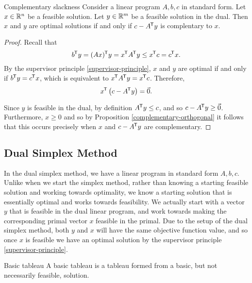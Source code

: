 \begin{thm}{Complementary slackness}\label{complementary-slackness}\proofbreak
    Consider a linear program $A, b, c$ in standard form. Let $x \in \mathbb{R}^n$ be a feasible solution. Let $y \in \mathbb{R}^m$ be a feasible solution in the dual. Then $x$ and $y$ are optimal solutions if and only if $c - A^{\mkern-1.5mu\mathsf{T}}y$ is complentary to $x$.
\end{thm}

\begin{proof}
    Recall that
    \begin{align*}
        b^{\mkern-1.5mu\mathsf{T}}y = (Ax)^{\mkern-1.5mu\mathsf{T}}y = x^{\mkern-1.5mu\mathsf{T}}A^{\mkern-1.5mu\mathsf{T}}y \leq x^{\mkern-1.5mu\mathsf{T}}c = c^{\mkern-1.5mu\mathsf{T}}x.
    \end{align*}
    By the supervisor principle \ref{supervisor-principle}, $x$ and $y$ are optimal if and only if $b^{\mkern-1.5mu\mathsf{T}}y = c^{\mkern-1.5mu\mathsf{T}}x$, which is equivalent to $x^{\mkern-1.5mu\mathsf{T}}A^{\mkern-1.5mu\mathsf{T}}y = x^{\mkern-1.5mu\mathsf{T}}c$. Therefore,
    \begin{align*}
        x^{\mkern-1.5mu\mathsf{T}}\left(c - A^{\mkern-1.5mu\mathsf{T}}y\right) = \vec{0}.
    \end{align*}

    Since $y$ is feasible in the dual, by definition $A^{\mkern-1.5mu\mathsf{T}}y \leq c$, and so $c - A^{\mkern-1.5mu\mathsf{T}}y \geq \vec{0}$. Furthermore, $x \geq 0$ and so by Proposition \ref{complementary-orthogonal} it follows that this occurs precisely when $x$ and $c - A^{\mkern-1.5mu\mathsf{T}}y$ are complementary.
\end{proof}

\subsection{Dual Simplex Method}

In the dual simplex method, we have a linear program in standard form $A, b, c$. Unlike when we start the simplex method, rather than knowing a starting feasible solution and working towards optimality, we know a starting solution that is essentially optimal and works towards feasibility. We actually start with a vector $y$ that is feasible in the dual linear program, and work towards making the corresponding primal vector $x$ feasible in the primal. Due to the setup of the dual simplex method, both $y$ and $x$ will have the same objective function value, and so once $x$ is feasible we have an optimal solution by the supervisor principle \ref{supervisor-principle}.

\begin{defn}{Basic tableau}\proofbreak
    A basic tableau is a tableau formed from a basic, but not necessarily feasible, solution.
\end{defn}

